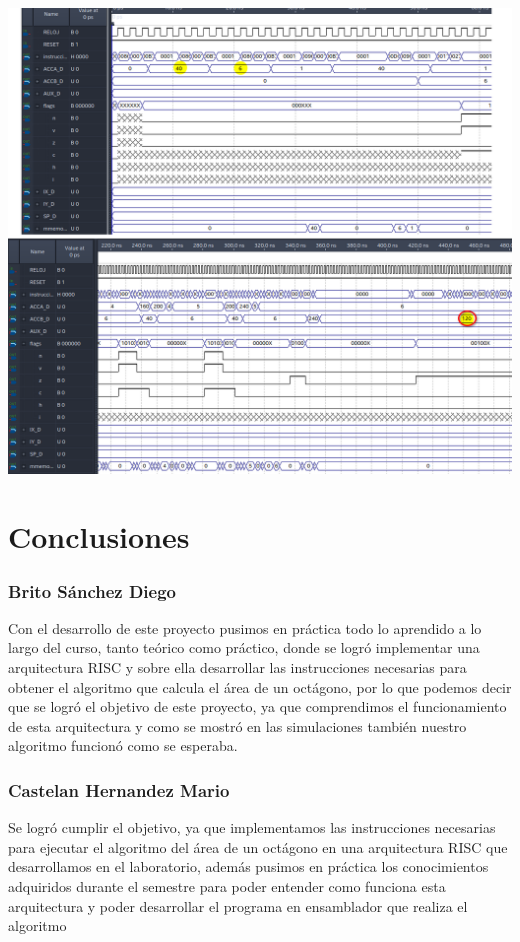 \documentclass{IEEEtran}
\begin{document}
\begin{center}
\includegraphics[width=.9\linewidth]{./img/40x6.png}
\end{center}
\section{Conclusiones}
\label{sec:org51f3083}
\subsubsection{Brito Sánchez Diego}
\label{sec:orgc9ae534}
Con el desarrollo de este proyecto pusimos en práctica todo lo aprendido a lo largo del curso, tanto teórico como práctico, donde se logró implementar una arquitectura RISC y sobre ella desarrollar las instrucciones necesarias para obtener el algoritmo que calcula el área de un octágono, por lo que podemos decir que se logró el objetivo de este proyecto, ya que comprendimos el funcionamiento de esta arquitectura y como se mostró en las simulaciones también nuestro algoritmo funcionó como se esperaba.

\subsubsection{Castelan Hernandez Mario}
\label{sec:org08c3ad1}
Se logró cumplir el objetivo, ya que implementamos las instrucciones necesarias para ejecutar el algoritmo del área de un octágono en una arquitectura RISC que desarrollamos en el laboratorio, además pusimos en práctica los conocimientos adquiridos durante el semestre para poder entender como funciona esta arquitectura y poder desarrollar el programa en ensamblador que realiza el algoritmo
\end{document}
